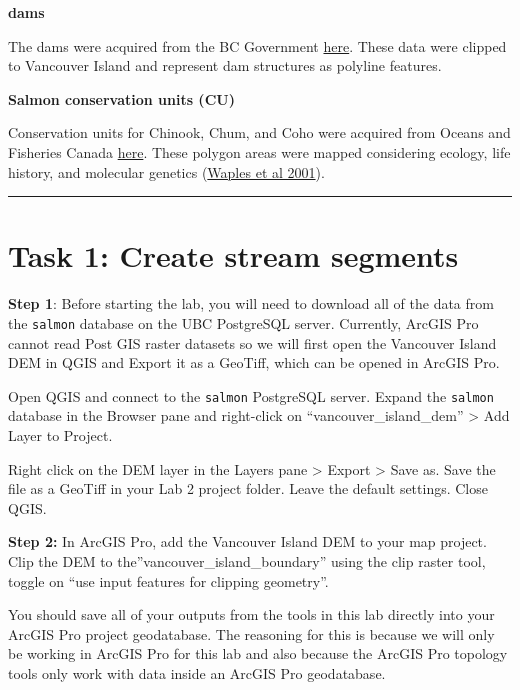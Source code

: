 \documentclass[
]{book}
\begin{document}
\textbf{dams}

The dams were acquired from the BC Government \href{https://catalogue.data.gov.bc.ca/dataset/bc-dams}{here}. These data were clipped to Vancouver Island and represent dam structures as polyline features.

\textbf{Salmon conservation units (CU)}

Conservation units for Chinook, Chum, and Coho were acquired from Oceans and Fisheries Canada \href{https://open.canada.ca/data/en/dataset/1ac00a39-4770-443d-8a6b-9656c06df6a3\#wb-auto-6}{here}. These polygon areas were mapped considering ecology, life history, and molecular genetics (\href{https://onlinelibrary.wiley.com/doi/abs/10.1111/j.1095-8649.2001.tb01376.x}{Waples et al 2001}).

\begin{center}\rule{0.5\linewidth}{0.5pt}\end{center}

\hypertarget{task-1-create-stream-segments}{%
\section*{Task 1: Create stream segments}\label{task-1-create-stream-segments}}

\textbf{Step 1}: Before starting the lab, you will need to download all of the data from the \texttt{salmon} database on the UBC PostgreSQL server. Currently, ArcGIS Pro cannot read Post GIS raster datasets so we will first open the Vancouver Island DEM in QGIS and Export it as a GeoTiff, which can be opened in ArcGIS Pro.

Open QGIS and connect to the \texttt{salmon} PostgreSQL server. Expand the \texttt{salmon} database in the Browser pane and right-click on ``vancouver\_island\_dem'' \textgreater{} Add Layer to Project.

Right click on the DEM layer in the Layers pane \textgreater{} Export \textgreater{} Save as. Save the file as a GeoTiff in your Lab 2 project folder. Leave the default settings. Close QGIS.

\textbf{Step 2:} In ArcGIS Pro, add the Vancouver Island DEM to your map project. Clip the DEM to the''vancouver\_island\_boundary'' using the clip raster tool, toggle on ``use input features for clipping geometry''.

You should save all of your outputs from the tools in this lab directly into your ArcGIS Pro project geodatabase. The reasoning for this is because we will only be working in ArcGIS Pro for this lab and also because the ArcGIS Pro topology tools only work with data inside an ArcGIS Pro geodatabase.
\end{document}
